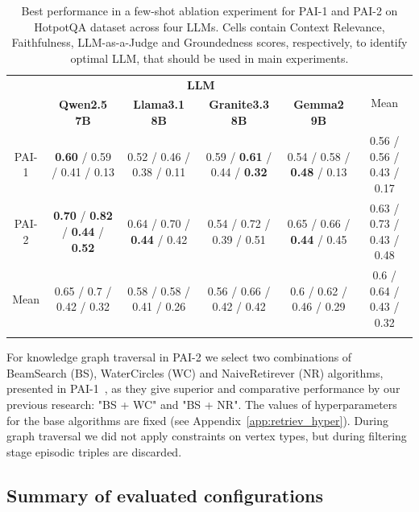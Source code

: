 \begin{table}[ht!]
    \centering
	\renewcommand{\arraystretch}{1.3}
    \begin{tabular}{|c|c|c|c|c||c|}
    \hhline{|-|----||-|}
    \multirow{2}{*}{\textbf{Method}} & \multicolumn{4}{c||}{\textbf{LLM}} & \multirow{2}{*}{Mean} \\ 
    \hhline{|~|----||~|}
     & \textbf{Qwen2.5 7B} & \textbf{Llama3.1 8B} & \textbf{Granite3.3 8B} & \textbf{Gemma2 9B} &  \\ 
     \hhline{=====::=}
    PAI-1 & \textbf{0.60} / 0.59 / 0.41 / 0.13 & 0.52 / 0.46 / 0.38 / 0.11 & 0.59 / \textbf{0.61} / 0.44 / \textbf{0.32} & 0.54 / 0.58 / \textbf{0.48} / 0.13 & 0.56 / 0.56 / 0.43 / 0.17 \\
    \hhline{|-|----||-|}
    PAI-2 & \textbf{0.70} / \textbf{0.82} / \textbf{0.44} / \textbf{0.52} & 0.64 / 0.70 / \textbf{0.44} / 0.42 & 0.54 / 0.72 / 0.39 / 0.51 & 0.65 / 0.66 / \textbf{0.44} / 0.45 & 0.63 / 0.73 / 0.43 / 0.48 \\ 
    \hhline{=====::=}
    Mean & 0.65 / 0.7 / 0.42 / 0.32 & 0.58 / 0.58 / 0.41 / 0.26 & 0.56 / 0.66 / 0.42 / 0.42 & 0.6 / 0.62 / 0.46 / 0.29 & 0.6 / 0.64 / 0.43 / 0.32 \\ 
    \hhline{|-|----||-|}
    \end{tabular}%
    \renewcommand{\arraystretch}{1}
    \caption{Best performance in a few-shot ablation experiment for PAI-1 and PAI-2 on HotpotQA dataset across four LLMs. Cells contain Context Relevance, Faithfulness, LLM-as-a-Judge and Groundedness scores, respectively, to identify optimal LLM, that should be used in main experiments.}
	\label{tab:llm_selection}
\end{table}

For knowledge graph traversal in PAI-2 we select two combinations of BeamSearch (BS), WaterCircles (WC) and NaiveRetirever (NR) algorithms, presented in PAI-1~\cite{11479299}, as they give superior and comparative performance by our previous research: "BS + WC" and "BS + NR". The values of hyperparameters for the base algorithms are fixed (see Appendix~\ref{app:retriev_hyper}). During graph traversal we did not apply constraints on vertex types, but during filtering stage episodic triples are discarded.

\subsection{Summary of evaluated configurations}

